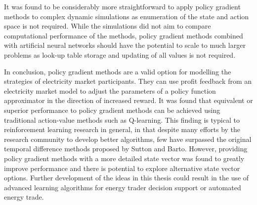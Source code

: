 It was found to be considerably more straightforward to apply policy gradient
methods to complex dynamic simulations as enumeration of the state and action
space is not required.  While the simulations did not aim to compare
computational performance of the methods, policy gradient methods combined with
artificial neural networks should have the potential to scale to much larger
problems as look-up table storage and updating of all values is not required.


In conclusion, policy gradient methods are a valid option for modelling the
strategies of electricity market participants.  They can use profit feedback
from an electricity market model to adjust the parameters of a policy function
approximator in the direction of increased reward.
It was found that equivalent or superior performance to policy gradient methods
can be achieved using traditional action-value methods such as Q-learning. This
finding is typical to reinforcement learning research in general, in that
despite many efforts by the research community to develop better algorithms, few
have surpassed the original temporal difference methods proposed by Sutton and
Barto. However, providing policy gradient methods with a more detailed state
vector was found to greatly improve performance and there is potential to
explore alternative state vector options.
Further development of the ideas in this thesis could result in the use of
advanced learning algorithms for energy trader decision support or automated
energy trade.

